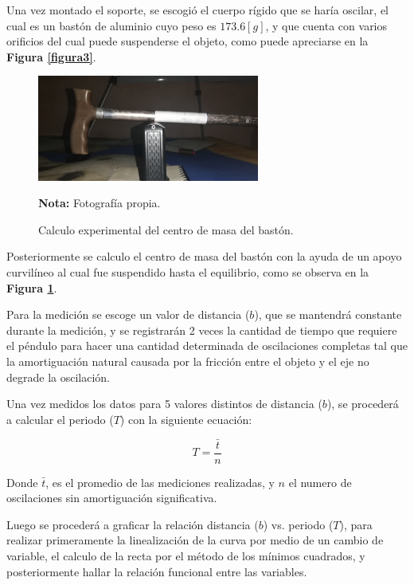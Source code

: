 \documentclass[letter,11pt]{article}
\newcommand{\source}[1]{\vspace{-11pt} \caption*{\small{\textbf{Nota:} {#1}}}}
\begin{document}
Una vez montado el soporte, se escogió el cuerpo rígido que se haría oscilar, el
cual es un bastón de aluminio cuyo peso es $173.6 [g]$, y que cuenta con varios
orificios del cual puede suspenderse el objeto, como puede apreciarse en la
\textbf{Figura \ref{figura3}}.

\begin{figure}
\centering
\includegraphics[width=0.65\textwidth]{resources/f4.eps}
\caption{Calculo experimental del centro de masa del bastón.}
\label{figura4}
\source{Fotografía propia.}
\end{figure}

Posteriormente se calculo el centro de masa del bastón con la ayuda de un apoyo
curvilíneo al cual fue suspendido hasta el equilibrio, como se observa en la
\textbf{Figura \ref{figura4}}.

Para la medición se escoge un valor de distancia ($b$), que se mantendrá
constante durante la medición, y se registrarán 2 veces la cantidad de tiempo
que requiere el péndulo para hacer una cantidad determinada de oscilaciones
completas tal que la amortiguación natural causada por la fricción entre el
objeto y el eje no degrade la oscilación.

Una vez medidos los datos para 5 valores distintos de distancia ($b$), se
procederá a calcular el periodo ($T$) con la siguiente ecuación:

\begin{equation}
    T = \frac{\bar{t}}{n}
\label{promedio}
\end{equation}
\vspace{0.10cm}

Donde $\bar{t}$, es el promedio de las mediciones realizadas, y $n$ el numero de
oscilaciones sin amortiguación significativa.

Luego se procederá a graficar la relación distancia ($b$) vs. periodo ($T$),
para realizar primeramente la linealización de la curva por medio de un cambio
de variable, el calculo de la recta por el método de los mínimos cuadrados, y
posteriormente hallar la relación funcional entre las variables.
\end{document}
